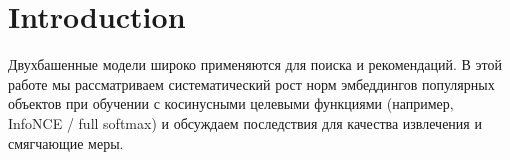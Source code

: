\section{Introduction}
Двухбашенные модели широко применяются для поиска и рекомендаций. В этой работе мы рассматриваем систематический рост норм эмбеддингов популярных объектов при обучении с косинусными целевыми функциями (например, InfoNCE / full softmax) и обсуждаем последствия для качества извлечения и смягчающие меры.
